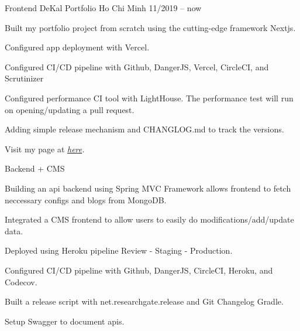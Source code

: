 
\begin{cventries}

    \cventry
    {Frontend} %
    {DeKal Portfolio} %
    {Ho Chi Minh} %
    {11/2019 -- now} %
    {
      \begin{cvitems} %
        \item {Built my portfolio project from scratch using the cutting-edge framework Nextjs.}
        \item {Configured app deployment with Vercel.}
        \item {Configured CI/CD pipeline with Github, DangerJS, Vercel, CircleCI, and Scrutinizer}
        \item {Configured performance CI tool with LightHouse. The performance test will run on opening/updating a pull request.}
        \item {Adding simple release mechanism and CHANGLOG.md to track the versions.}
        \item {Visit my page at \it \href{https://phatho-folio.now.sh/}{here}. }
      \end{cvitems}
    }

    \cventry
    {Backend + CMS} %
    {} %
    {} %
    {} %
    {
      \begin{cvitems} %
        \item {Building an api backend using Spring MVC Framework allows frontend to fetch neccessary configs and blogs from MongoDB.}
        \item {Integrated a CMS frontend to allow users to easily do modifications/add/update data.}
        \item {Deployed using Heroku pipeline Review - Staging - Production.}
        \item {Configured CI/CD pipeline with Github, DangerJS, CircleCI, Heroku, and Codecov.}
        \item {Built a release script with net.researchgate.release and Git Changelog Gradle.}
        \item {Setup Swagger to document apis. }
      \end{cvitems}
    }


\end{cventries}
